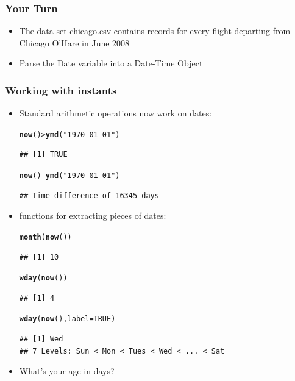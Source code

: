 \documentclass{beamer}\usepackage[]{graphicx}\usepackage[]{color}
\makeatletter
\newcommand{\hlnum}[1]{\textcolor[rgb]{0.686,0.059,0.569}{#1}}%
\newcommand{\hlstr}[1]{\textcolor[rgb]{0.192,0.494,0.8}{#1}}%
\newcommand{\hlopt}[1]{\textcolor[rgb]{0,0,0}{#1}}%
\newcommand{\hlstd}[1]{\textcolor[rgb]{0.345,0.345,0.345}{#1}}%
\newcommand{\hlkwc}[1]{\textcolor[rgb]{0.333,0.667,0.333}{#1}}%
\newcommand{\hlkwd}[1]{\textcolor[rgb]{0.737,0.353,0.396}{\textbf{#1}}}%
\newenvironment{kframe}{%
 \def\at@end@of@kframe{}%
 \ifinner\ifhmode%
  \def\at@end@of@kframe{\end{minipage}}%
  \begin{minipage}{\columnwidth}%
 \fi\fi%
 \def\FrameCommand##1{\hskip\@totalleftmargin \hskip-\fboxsep
 \colorbox{shadecolor}{##1}\hskip-\fboxsep
     \hskip-\linewidth \hskip-\@totalleftmargin \hskip\columnwidth}%
 \MakeFramed {\advance\hsize-\width
   \@totalleftmargin\z@ \linewidth\hsize
   \@setminipage}}%
 {\par\unskip\endMakeFramed%
 \at@end@of@kframe}
\newenvironment{knitrout}{}{} %
\makeatother
\begin{document}
\begin{frame}
\frametitle{Your Turn}
\begin{itemize}
\item The data set \href{http://www.hofroe.net/R\%20workshops/02-r-graphics/data/05-data/chicago.csv}{chicago.csv} contains records for every flight departing from Chicago O'Hare in June 2008\medskip
\item Parse the Date variable into a Date-Time Object
\end{itemize}
\end{frame}

\begin{frame}[fragile]
\frametitle{Working with instants}
\begin{itemize}
\item Standard arithmetic operations now work on dates:
\begin{knitrout}\footnotesize
{}\color{fgcolor}\begin{kframe}
\begin{alltt}
\hlkwd{now}\hlstd{()} \hlopt{>} \hlkwd{ymd}\hlstd{(}\hlstr{"1970-01-01"}\hlstd{)}
\end{alltt}
\begin{verbatim}
## [1] TRUE
\end{verbatim}
\begin{alltt}
\hlkwd{now}\hlstd{()} \hlopt{-} \hlkwd{ymd}\hlstd{(}\hlstr{"1970-01-01"}\hlstd{)}
\end{alltt}
\begin{verbatim}
## Time difference of 16345 days
\end{verbatim}
\end{kframe}
\end{knitrout}
\item functions for extracting pieces of dates:
\begin{knitrout}\footnotesize
{}\color{fgcolor}\begin{kframe}
\begin{alltt}
\hlkwd{month}\hlstd{(}\hlkwd{now}\hlstd{())}
\end{alltt}
\begin{verbatim}
## [1] 10
\end{verbatim}
\begin{alltt}
\hlkwd{wday}\hlstd{(}\hlkwd{now}\hlstd{())}
\end{alltt}
\begin{verbatim}
## [1] 4
\end{verbatim}
\begin{alltt}
\hlkwd{wday}\hlstd{(}\hlkwd{now}\hlstd{(),} \hlkwc{label}\hlstd{=}\hlnum{TRUE}\hlstd{)}
\end{alltt}
\begin{verbatim}
## [1] Wed
## 7 Levels: Sun < Mon < Tues < Wed < ... < Sat
\end{verbatim}
\end{kframe}
\end{knitrout}
\item What's your age in days?
\end{itemize}
\end{frame}
\end{document}
